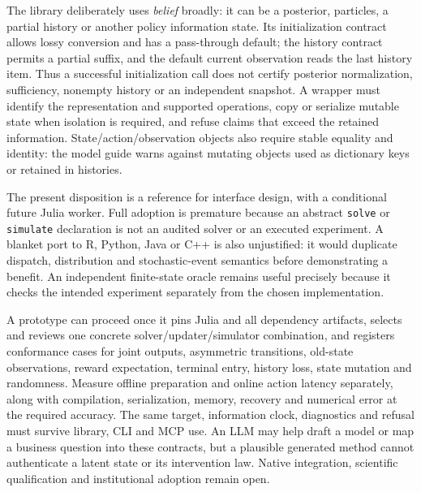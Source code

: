 The library deliberately uses \emph{belief} broadly: it can be a posterior,
particles, a partial history or another policy information state. Its
initialization contract allows lossy conversion and has a pass-through default;
the history contract permits a partial suffix, and the default current
observation reads the last history item. Thus a successful initialization call
does not certify posterior normalization, sufficiency, nonempty history or an
independent snapshot. A wrapper must identify the representation and supported
operations, copy or serialize mutable state when isolation is required, and
refuse claims that exceed the retained information. State/action/observation
objects also require stable equality and identity: the model guide warns
against mutating objects used as dictionary keys or retained in histories.
\citep{exec23_pomdpsjl_sources}

The present disposition is a reference for interface design, with a conditional
future Julia worker. Full adoption is premature because an abstract
\texttt{solve} or \texttt{simulate} declaration is not an audited solver or
an executed experiment. A blanket port to R, Python, Java or C++ is also
unjustified: it would duplicate dispatch, distribution and stochastic-event
semantics before demonstrating a benefit. An independent finite-state oracle
remains useful precisely because it checks the intended experiment separately
from the chosen implementation.
\citep{exec23_pomdpsjl_sources,exec23_pomdpsjl_reference}

A prototype can proceed once it pins Julia and all dependency artifacts,
selects and reviews one concrete solver/updater/simulator combination, and
registers conformance cases for joint outputs, asymmetric transitions,
old-state observations, reward expectation, terminal entry, history loss,
state mutation and randomness. Measure offline preparation and online action
latency separately, along with compilation, serialization, memory, recovery
and numerical error at the required accuracy. The same target, information
clock, diagnostics and refusal must survive library, CLI and MCP use.
An LLM may help draft a model or map a business question into these contracts,
but a plausible generated method cannot authenticate a latent state or its
intervention law. Native integration, scientific qualification and institutional
adoption remain open.
\citep{exec23_pomdpsjl_sources}
